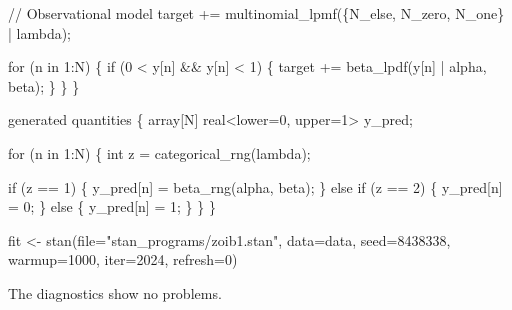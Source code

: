 \documentclass[
  letterpaper,
  DIV=11,
  numbers=noendperiod]{scrartcl}
\newenvironment{Shaded}{\begin{snugshade}}{\end{snugshade}}
\newcommand{\AttributeTok}[1]{\textcolor[rgb]{0.40,0.45,0.13}{#1}}
\newcommand{\CommentTok}[1]{\textcolor[rgb]{0.37,0.37,0.37}{#1}}
\newcommand{\ControlFlowTok}[1]{\textcolor[rgb]{0.00,0.23,0.31}{#1}}
\newcommand{\DataTypeTok}[1]{\textcolor[rgb]{0.68,0.00,0.00}{#1}}
\newcommand{\DecValTok}[1]{\textcolor[rgb]{0.68,0.00,0.00}{#1}}
\newcommand{\FunctionTok}[1]{\textcolor[rgb]{0.28,0.35,0.67}{#1}}
\newcommand{\KeywordTok}[1]{\textcolor[rgb]{0.00,0.23,0.31}{#1}}
\newcommand{\NormalTok}[1]{\textcolor[rgb]{0.00,0.23,0.31}{#1}}
\newcommand{\OtherTok}[1]{\textcolor[rgb]{0.00,0.23,0.31}{#1}}
\newcommand{\SpecialCharTok}[1]{\textcolor[rgb]{0.37,0.37,0.37}{#1}}
\newcommand{\StringTok}[1]{\textcolor[rgb]{0.13,0.47,0.30}{#1}}
\begin{document}
\begin{codelisting}
\begin{Shaded}
\begin{Highlighting}[]
  \CommentTok{// Observational model}
  \KeywordTok{target +=}\NormalTok{ multinomial\_lpmf(\{N\_else, N\_zero, N\_one\} | lambda);}

  \ControlFlowTok{for}\NormalTok{ (n }\ControlFlowTok{in} \DecValTok{1}\NormalTok{:N) \{}
    \ControlFlowTok{if}\NormalTok{ (}\DecValTok{0}\NormalTok{ \textless{} y[n] \&\& y[n] \textless{} }\DecValTok{1}\NormalTok{) \{}
      \KeywordTok{target +=}\NormalTok{ beta\_lpdf(y[n] | alpha, beta);}
\NormalTok{    \}}
\NormalTok{  \}}
\NormalTok{\}}

\KeywordTok{generated quantities}\NormalTok{ \{}
  \DataTypeTok{array}\NormalTok{[N] }\DataTypeTok{real}\NormalTok{\textless{}}\KeywordTok{lower}\NormalTok{=}\DecValTok{0}\NormalTok{, }\KeywordTok{upper}\NormalTok{=}\DecValTok{1}\NormalTok{\textgreater{} y\_pred;}

  \ControlFlowTok{for}\NormalTok{ (n }\ControlFlowTok{in} \DecValTok{1}\NormalTok{:N) \{}
    \DataTypeTok{int}\NormalTok{ z = categorical\_rng(lambda);}

    \ControlFlowTok{if}\NormalTok{ (z == }\DecValTok{1}\NormalTok{) \{}
\NormalTok{      y\_pred[n] = beta\_rng(alpha, beta);}
\NormalTok{    \} }\ControlFlowTok{else} \ControlFlowTok{if}\NormalTok{ (z == }\DecValTok{2}\NormalTok{) \{}
\NormalTok{      y\_pred[n] = }\DecValTok{0}\NormalTok{;}
\NormalTok{    \} }\ControlFlowTok{else}\NormalTok{ \{}
\NormalTok{      y\_pred[n] = }\DecValTok{1}\NormalTok{;}
\NormalTok{    \}}
\NormalTok{  \}}
\NormalTok{\}}
\end{Highlighting}
\end{Shaded}

\end{codelisting}

\begin{Shaded}
\begin{Highlighting}[]
\NormalTok{fit }\OtherTok{\textless{}{-}} \FunctionTok{stan}\NormalTok{(}\AttributeTok{file=}\StringTok{"stan\_programs/zoib1.stan"}\NormalTok{,}
            \AttributeTok{data=}\NormalTok{data, }\AttributeTok{seed=}\DecValTok{8438338}\NormalTok{,}
            \AttributeTok{warmup=}\DecValTok{1000}\NormalTok{, }\AttributeTok{iter=}\DecValTok{2024}\NormalTok{, }\AttributeTok{refresh=}\DecValTok{0}\NormalTok{)}
\end{Highlighting}
\end{Shaded}

The diagnostics show no problems.

\begin{Shaded}
\end{Shaded}
\end{document}
